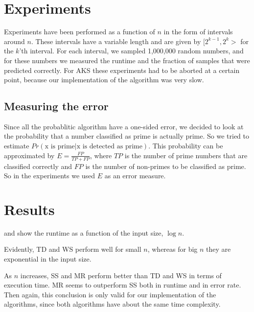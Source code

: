 
\section{Experiments}
\label{sec:experiments}

Experiments have been performed as a function of $n$ in the form of intervals around $n$.
These intervals have a variable length and are given by $[2^{k-1}, 2^k>$ for the $k$'th interval.
For each interval, we sampled 1,000,000 random numbers,
and for these numbers we measured the runtime and the fraction of samples that were predicted correctly.
For AKS these experiments had to be aborted at a certain point, because our implementation of the algorithm was very slow.

\subsection{Measuring the error}
Since all the probablitic algorithm have a one-sided error, we decided to look at the probability that a number classified as prime is actually prime.
So we tried to estimate $Pr(\text{x is prime} | \text{x is detected as prime})$.
This probability can be approximated by $E = \frac{FP}{TP + FP}$, where $TP$ is the number of prime numbers that are classified correctly and $FP$ is the number of non-primes to be classified as prime.
So in the experiments we used $E$ as an error measure.

\section{Results}
\label{sec:results}

 and  show the runtime as a function of the input size, $\log n$.

Evidently, TD and WS perform well for small $n$, whereas for big $n$ they are exponential in the input size.

As $n$ increases, SS and MR perform better than TD and WS in terms of execution time.
MR seems to outperform SS both in runtime and in error rate.
Then again, this conclusion is only valid for our implementation of the algorithms, since both algorithms have about the same time complexity.


